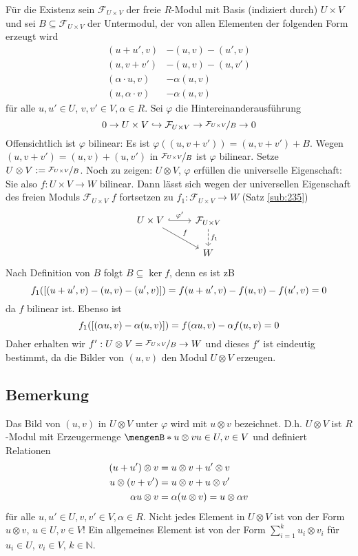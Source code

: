 Für die Existenz sein $\mathcal{F}_{U \times V}$ der freie $R$-Modul mit Basis (indiziert durch) $U \times V$ und sei $B \subseteq \mathcal{F}_{U \times V}$ der Untermodul,
der von allen Elementen der folgenden Form erzeugt wird
\begin{align*}
	(u+u', v) &- (u,v) - (u', v) \\
	(u,v+v') &- (u,v) - (u,v') \\
	(\alpha \cdot u, v) &- \alpha(u,v) \\
	(u, \alpha \cdot v) &- \alpha(u,v)
\end{align*}
für alle $u,u' \in U$, $v,v' \in V, \alpha \in R$. Sei $\varphi$ die Hintereinanderausführung
\[
	0 \to U \times V \hookrightarrow \mathcal{F}_{U \times V} \to \nicefrac{\mathcal{F}_{U \times V}}{B} \to 0
\]
Offensichtlich ist $\varphi$ bilinear: Es ist $\varphi((u,v+ v')) = (u, v+ v')+ B $. Wegen $(u, v+v')= (u,v)+ (u, v')$ in $\nicefrac{\mathcal{F}_{U\times V}}{B}$ ist
$\varphi$ bilinear. Setze $U \otimes V := \nicefrac{\mathcal{F}_{U \times V}}{B}$. Noch zu zeigen: $U \otimes V$, $\varphi$ erfüllen die universelle Eigenschaft:
Sie also $f : U \times V \to W$ bilinear. Dann lässt sich wegen der universellen Eigenschaft des freien Moduls $\mathcal{F}_{U \times V}$ $f$ fortsetzen zu 
$f_1 : \mathcal{F}_{U \times V} \to W$ (Satz \ref{sub:235})
\[
	\begin{tikzcd}
		U \times V \rar[hook]{\varphi'} \drar{f}& \mathcal{F}_{U \times V} \dar[dashed]{f_1}\\
		& W
	\end{tikzcd}
\]
Nach Definition von $B$ folgt $B \subseteq \ker f$, denn es ist zB
\[
	f_1 \enbrace*{ \benbrace{(u+ u', v) - (u,v)- (u',v)}} = f(u+u',v) - f(u,v) - f(u',v) = 0 
\]
da $f$ bilinear ist. Ebenso ist
\[
	f_1 \enbrace*{ \benbrace{(\alpha u, v) - \alpha(u,v)}} = f(\alpha u,v) - \alpha f(u,v)  = 0 
\]
Daher erhalten wir $f' : U \otimes V = \nicefrac{\mathcal{F}_{U \times V}}{B} \to W$ und dieses $f'$ ist eindeutig bestimmt, da die Bilder von $(u,v)$ den Modul 
$U \otimes V$ erzeugen. \bewende

\subsection[Bemerkung: Elemente des Tensorprodukts]{Bemerkung} %
\label{sub:32}
Das Bild von $(u,v)$ in $U \otimes V$ unter $\varphi$ wird mit $u \otimes v$ bezeichnet. D.h. $U \otimes V$ ist $R$-Modul mit Erzeugermenge 
$\set[u \otimes v]{u \in U, v \in V} $ und definiert Relationen
\begin{align*}
	(u+ u') \otimes v &= u \otimes v + u' \otimes v \\
	u \otimes (v+v') &= u \otimes v + u \otimes v' \\
	\alpha u \otimes v &=  \alpha \enbrace*{u \otimes v} = u \otimes \alpha v 
\end{align*}
für alle $u,u' \in U, v,v' \in V, \alpha \in R$. 
Nicht jedes Element in $U \otimes V$ ist von der Form $u \otimes v$, $u \in U, v \in V$! Ein allgemeines Element ist von der Form $\sum_{i=1}^{k} u_i \otimes v_i $ für
$u_i \in U$, $v_i \in V$, $k \in \mathds{N}$.

